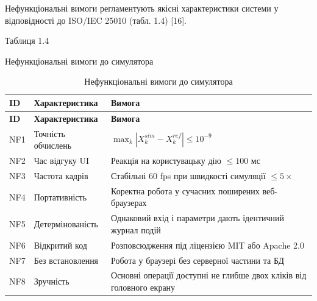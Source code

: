 \documentclass[
]{article}
\begin{document}
Нефункціональні вимоги регламентують якісні характеристики системи у
відповідності до ISO/IEC 25010 (табл. 1.4) {[}16{]}.

Таблиця 1.4

Нефункціональні вимоги до симулятора

\begin{longtable}[]{@{}
  >{\raggedright\arraybackslash}p{}
  >{\raggedright\arraybackslash}p{}
  >{\raggedright\arraybackslash}p{}@{}}
\caption[Нефункціональні вимоги до симулятора]{Нефункціональні вимоги до
симулятора}\tabularnewline
\toprule\noalign{}
\begin{minipage}[b]{\linewidth}\raggedright
\textbf{ID}
\end{minipage} & \begin{minipage}[b]{\linewidth}\raggedright
\textbf{Характеристика}
\end{minipage} & \begin{minipage}[b]{\linewidth}\raggedright
\textbf{Вимога}
\end{minipage} \\
\midrule\noalign{}
\endfirsthead
\toprule\noalign{}
\begin{minipage}[b]{\linewidth}\raggedright
\textbf{ID}
\end{minipage} & \begin{minipage}[b]{\linewidth}\raggedright
\textbf{Характеристика}
\end{minipage} & \begin{minipage}[b]{\linewidth}\raggedright
\textbf{Вимога}
\end{minipage} \\
\midrule\noalign{}
\endhead
\bottomrule\noalign{}
\endlastfoot
NF1 & Точність обчислень &
\(\max_{k}|X_{k}^{sim} - X_{k}^{ref}| \leq 10^{- 9}\) \\
NF2 & Час відгуку UI & Реакція на користувацьку дію \(\leq 100\) мс \\
NF3 & Частота кадрів & Стабільні 60 fps при швидкості симуляції
\(\leq 5 \times\) \\
NF4 & Портативність & Коректна робота у сучасних поширених
веб-браузерах \\
NF5 & Детермінованість & Однаковий вхід і параметри дають ідентичний
журнал подій \\
NF6 & Відкритий код & Розповсюдження під ліцензією MIT або Apache 2.0 \\
NF7 & Без встановлення & Робота у браузері без серверної частини та
БД \\
NF8 & Зручність & Основні операції доступні не глибше двох кліків від
головного екрану \\
\end{longtable}
\end{document}
